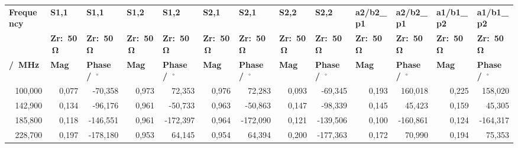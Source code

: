 \begin{longtable}{rrrrrrrrrrrrr}
\multicolumn{1}{l}{\textbf{Frequency}} & \multicolumn{1}{l}{\textbf{S1,1}} & \multicolumn{1}{l}{\textbf{S1,1}} & \multicolumn{1}{l}{\textbf{S1,2}} & \multicolumn{1}{l}{\textbf{S1,2}} & \multicolumn{1}{l}{\textbf{S2,1}} & \multicolumn{1}{l}{\textbf{S2,1}} & \multicolumn{1}{l}{\textbf{S2,2}} & \multicolumn{1}{l}{\textbf{S2,2}} & \multicolumn{1}{l}{\textbf{a2/b2\_p1}} & \multicolumn{1}{l}{\textbf{a2/b2\_p1}} & \multicolumn{1}{l}{\textbf{a1/b1\_p2}} & \multicolumn{1}{l}{\textbf{a1/b1\_p2}}\\
\multicolumn{1}{l}{\textbf{}} & \multicolumn{1}{l}{\textbf{Zr:~50\,$\mathbf{\Omega}$}} & \multicolumn{1}{l}{\textbf{Zr:~50\,$\mathbf{\Omega}$}} & \multicolumn{1}{l}{\textbf{Zr:~50\,$\mathbf{\Omega}$}} & \multicolumn{1}{l}{\textbf{Zr:~50\,$\mathbf{\Omega}$}} & \multicolumn{1}{l}{\textbf{Zr:~50\,$\mathbf{\Omega}$}} & \multicolumn{1}{l}{\textbf{Zr:~50\,$\mathbf{\Omega}$}} & \multicolumn{1}{l}{\textbf{Zr:~50\,$\mathbf{\Omega}$}} & \multicolumn{1}{l}{\textbf{Zr:~50\,$\mathbf{\Omega}$}} & \multicolumn{1}{l}{\textbf{Zr:~50\,$\mathbf{\Omega}$}} & \multicolumn{1}{l}{\textbf{Zr:~50\,$\mathbf{\Omega}$}} & \multicolumn{1}{l}{\textbf{Zr:~50\,$\mathbf{\Omega}$}} & \multicolumn{1}{l}{\textbf{Zr:~50\,$\mathbf{\Omega}$}}\\
\multicolumn{1}{l}{\textbf{/~MHz}} & \multicolumn{1}{l}{\textbf{Mag}} & \multicolumn{1}{l}{\textbf{Phase~/~$\mathbf{^{\circ}}$}} & \multicolumn{1}{l}{\textbf{Mag}} & \multicolumn{1}{l}{\textbf{Phase~/~$\mathbf{^{\circ}}$}} & \multicolumn{1}{l}{\textbf{Mag}} & \multicolumn{1}{l}{\textbf{Phase~/~$\mathbf{^{\circ}}$}} & \multicolumn{1}{l}{\textbf{Mag}} & \multicolumn{1}{l}{\textbf{Phase~/~$\mathbf{^{\circ}}$}} & \multicolumn{1}{l}{\textbf{Mag}} & \multicolumn{1}{l}{\textbf{Phase~/~$\mathbf{^{\circ}}$}} & \multicolumn{1}{l}{\textbf{Mag}} & \multicolumn{1}{l}{\textbf{Phase~/~$\mathbf{^{\circ}}$}}\\
\hline
\endhead
100,000 & 0,077 & -70,358 & 0,973 & 72,353 & 0,976 & 72,283 & 0,093 & -69,345 & 0,193 & 160,018 & 0,225 & 158,020\\
142,900 & 0,134 & -96,176 & 0,961 & -50,733 & 0,963 & -50,863 & 0,147 & -98,339 & 0,145 & 45,423 & 0,159 & 45,305\\
185,800 & 0,118 & -146,551 & 0,961 & -172,397 & 0,964 & -172,090 & 0,121 & -139,506 & 0,100 & -160,861 & 0,124 & -164,317\\
228,700 & 0,197 & -178,180 & 0,953 & 64,145 & 0,954 & 64,394 & 0,200 & -177,363 & 0,172 & 70,990 & 0,194 & 75,353\\

\end{longtable}
